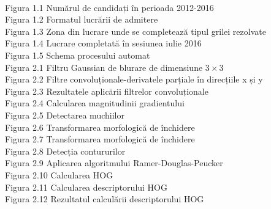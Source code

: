 \documentclass[a4paper,12pt]{report}
\newcommand\tab[1][1cm]{\hspace*{#1}}
\begin{document}
\listoffigures 
\tab \\
Figura 1.1 \hspace{2mm} Numărul de candidați în perioada 2012-2016\\
Figura 1.2 \hspace{2mm} Formatul lucrării de admitere\\
Figura 1.3 \hspace{2mm} Zona din lucrare unde se completează tipul grilei rezolvate\\
Figura 1.4 \hspace{2mm} Lucrare completată în sesiunea iulie 2016\\
Figura 1.5 \hspace{2mm} Schema procesului automat\\
Figura 2.1 \hspace{2mm} Filtru Gaussian de blurare de dimensiune $3\times3$\\
Figura 2.2 \hspace{2mm} Filtre convoluționale-derivatele parțiale în direcțiile x și y\\
Figura 2.3 \hspace{2mm} Rezultatele aplicării filtrelor convoluționale\\
Figura 2.4 \hspace{2mm} Calcularea magnitudinii gradientului\\
Figura 2.5 \hspace{2mm} Detectarea muchiilor\\
Figura 2.6 \hspace{2mm} Transformarea morfologică de închidere\\
Figura 2.7 \hspace{2mm} Transformarea morfologică de închidere\\
Figura 2.8 \hspace{2mm} Detecția contururilor\\
Figura 2.9 \hspace{2mm} Aplicarea algoritmului Ramer-Douglas-Peucker\\
Figura 2.10 \hspace{2mm} Calcularea HOG\\
Figura 2.11 \hspace{2mm} Calcularea descriptorului HOG\\
Figura 2.12 \hspace{2mm} Rezultatul calculării descriptorului HOG\\
\end{document}
